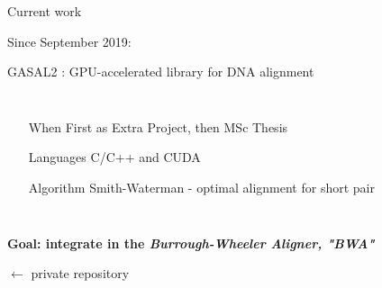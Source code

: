 
\begin{frame}{Current work}

	\begin{center}
		Since September 2019:
		
		GASAL2 : GPU-accelerated library for DNA alignment
	\end{center}
	\begin{columns}
		\begin{itemize}
			\item[When]	First as Extra Project, then MSc Thesis
			\item[Languages] C/C++ and CUDA
			\item[Algorithm] Smith-Waterman - optimal alignment for short pair
		\end{itemize}	
	\end{columns}

	\bigskip
	\textbf{Goal: integrate in the \emph{Burrough-Wheeler Aligner, "BWA"}}
	\bigskip
	
	 $\leftarrow$ private repository
	
\end{frame}